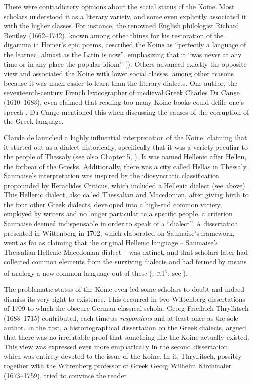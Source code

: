 There were contradictory opinions about the social status of the Koine. Most scholars understood it as a literary variety, and some even explicitly associated it with the higher classes. For instance, the renowned English philologist Richard Bentley (1662–1742), known among other things for his restoration of the digamma in Homer’s epic poems, described the Koine as “perfectly a language of the learned, almost as the Latin is now”, emphasizing that it “was never at any time or in any place the popular idiom” (\citeyear[406]{Bentley1699}). Others advanced exactly the opposite view and associated the Koine with lower social classes, among other reasons because it was much easier to learn than the literary dialects. One author, the seventeenth-century French lexicographer of medieval Greek Charles Du Cange (1610–1688), even claimed that reading too many Koine books could defile one’s speech \citep[iv]{Du1688}. Du Cange mentioned this when discussing the causes of the corruption of the Greek language.

Claude de \citet[esp. 405--406]{Saumaise1643a} launched a highly influential interpretation of the Koine, claiming that it started out as a dialect historically, specifically that it was a variety peculiar to the people of Thessaly (see also Chapter 5, ). It was named Hellenic after Hellen, the forbear of the Greeks. Additionally, there was a city called Hellas in Thessaly. Saumaise's interpretation was inspired by the idiosyncratic classification propounded by Heraclides Criticus, which included a Hellenic dialect (see  above). This Hellenic dialect, also called Thessalian and Macedonian, after giving birth to the four other Greek dialects, developed into a high-end common variety, employed by writers and no longer particular to a specific people, a criterion Saumaise deemed indispensable in order to speak of a “dialect”. A dissertation presented in Wittenberg in 1702, which elaborated on Saumaise’s framework, went as far as claiming that the original Hellenic language – Saumaise’s Thessalian-Hellenic-Macedonian dialect – was extinct, and that scholars later had collected common elements from the surviving dialects and had formed by means of analogy a new common language out of these (\citealt{Schwartz1702}: \textsc{c}.1\textsc{\textsuperscript{v}}; see \citet[]{VanRooyFce}).

The problematic status of the Koine even led some scholars to doubt and indeed dismiss its very right to existence. This occurred in two Wittenberg dissertations of 1709 to which the obscure German classical scholar Georg Friedrich Thryllitsch (1688–1715) contributed, each time as \textit{respondens} and at least once as the sole author. In the first, a historiographical dissertation on the Greek dialects, \citet[\textsc{d.1}\textsc{\textsuperscript{v}}]{Thryllitsch1709} argued that there was no irrefutable proof that something like the Koine actually existed. This view was expressed even more emphatically in the second dissertation, which was entirely devoted to the issue of the Koine. In it, Thryllitsch, possibly together with the Wittenberg professor of Greek Georg Wilhelm Kirchmaier (1673–1759), tried to convince the reader

